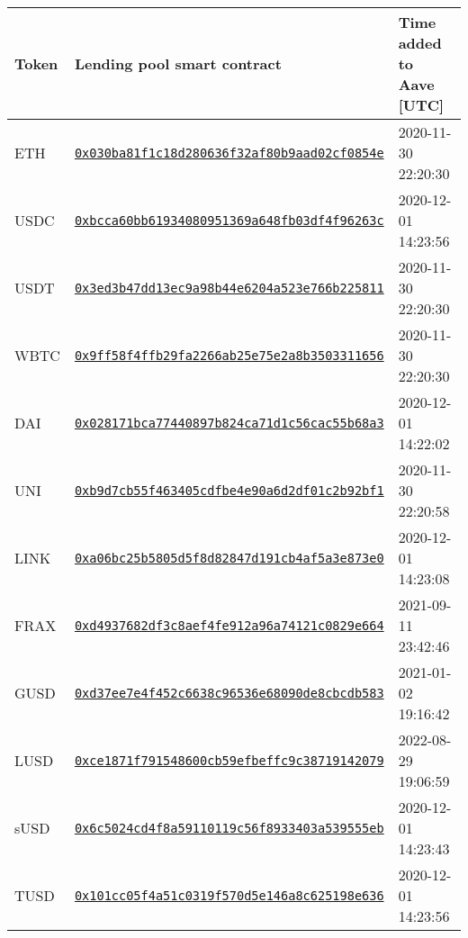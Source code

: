 \begin{tabular}{lll}
\toprule
Token &                                                                                                    Lending pool smart contract & Time added to Aave [UTC] \\
\midrule
  ETH & \href{https://etherscan.io/address/0x030ba81f1c18d280636f32af80b9aad02cf0854e}{\tt 0x030ba81f1c18d280636f32af80b9aad02cf0854e} &      2020-11-30 22:20:30 \\
 USDC & \href{https://etherscan.io/address/0xbcca60bb61934080951369a648fb03df4f96263c}{\tt 0xbcca60bb61934080951369a648fb03df4f96263c} &      2020-12-01 14:23:56 \\
 USDT & \href{https://etherscan.io/address/0x3ed3b47dd13ec9a98b44e6204a523e766b225811}{\tt 0x3ed3b47dd13ec9a98b44e6204a523e766b225811} &      2020-11-30 22:20:30 \\
 WBTC & \href{https://etherscan.io/address/0x9ff58f4ffb29fa2266ab25e75e2a8b3503311656}{\tt 0x9ff58f4ffb29fa2266ab25e75e2a8b3503311656} &      2020-11-30 22:20:30 \\
  DAI & \href{https://etherscan.io/address/0x028171bca77440897b824ca71d1c56cac55b68a3}{\tt 0x028171bca77440897b824ca71d1c56cac55b68a3} &      2020-12-01 14:22:02 \\
  UNI & \href{https://etherscan.io/address/0xb9d7cb55f463405cdfbe4e90a6d2df01c2b92bf1}{\tt 0xb9d7cb55f463405cdfbe4e90a6d2df01c2b92bf1} &      2020-11-30 22:20:58 \\
 LINK & \href{https://etherscan.io/address/0xa06bc25b5805d5f8d82847d191cb4af5a3e873e0}{\tt 0xa06bc25b5805d5f8d82847d191cb4af5a3e873e0} &      2020-12-01 14:23:08 \\
 FRAX & \href{https://etherscan.io/address/0xd4937682df3c8aef4fe912a96a74121c0829e664}{\tt 0xd4937682df3c8aef4fe912a96a74121c0829e664} &      2021-09-11 23:42:46 \\
 GUSD & \href{https://etherscan.io/address/0xd37ee7e4f452c6638c96536e68090de8cbcdb583}{\tt 0xd37ee7e4f452c6638c96536e68090de8cbcdb583} &      2021-01-02 19:16:42 \\
 LUSD & \href{https://etherscan.io/address/0xce1871f791548600cb59efbeffc9c38719142079}{\tt 0xce1871f791548600cb59efbeffc9c38719142079} &      2022-08-29 19:06:59 \\
 sUSD & \href{https://etherscan.io/address/0x6c5024cd4f8a59110119c56f8933403a539555eb}{\tt 0x6c5024cd4f8a59110119c56f8933403a539555eb} &      2020-12-01 14:23:43 \\
 TUSD & \href{https://etherscan.io/address/0x101cc05f4a51c0319f570d5e146a8c625198e636}{\tt 0x101cc05f4a51c0319f570d5e146a8c625198e636} &      2020-12-01 14:23:56 \\

\end{tabular}
